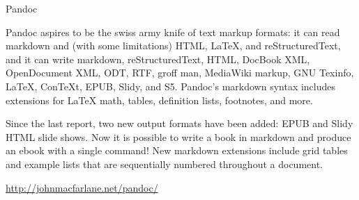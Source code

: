 \begin{hcarentry}[updated]{Pandoc}
\label{pandoc}
\makeheader

Pandoc aspires to be the swiss army knife of text markup formats: it
can read markdown and (with some limitations) HTML, LaTeX, and
reStructuredText, and it can write markdown, reStructuredText, HTML,
DocBook XML, OpenDocument XML, ODT, RTF, groff man, MediaWiki markup,
GNU Texinfo, LaTeX, ConTeXt, EPUB, Slidy, and S5.  Pandoc's markdown syntax includes
extensions for LaTeX math, tables, definition lists, footnotes, and more.

Since the last report, two new output formats have been added:
EPUB and Slidy HTML slide shows.  Now it is possible to write
a book in markdown and produce an ebook with a single command!
New markdown extensions include grid tables and example lists that are
sequentially numbered throughout a document.

\FurtherReading
    \url{http://johnmacfarlane.net/pandoc/}
\end{hcarentry}
